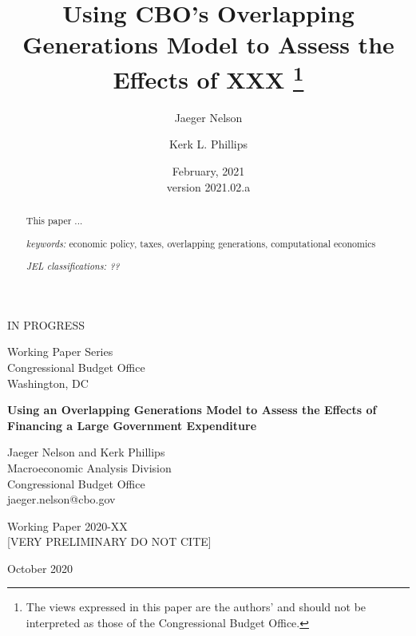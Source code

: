 \documentclass[letterpaper,12pt]{article}
\numberwithin{equation}{section}
\numberwithin{figure}{section}
\numberwithin{table}{section}
\begin{document}
\begin{titlepage}
	\title{Using CBO's Overlapping Generations Model to Assess the Effects of XXX
	\thanks{The views expressed in this paper are the authors' and should not be interpreted as those of the Congressional Budget Office.}}

    \author[1]{Jaeger Nelson}
	\author[1]{Kerk L. Phillips}


	\date{February, 2021\\
	\small{version 2021.02.a}}
	
	\maketitle

	\vspace{-0.3 in}
	\begin{abstract}
	\small{
	This paper ... 

	\vspace{0.1 in}

	\textit{keywords:} economic policy, taxes, overlapping generations, computational economics

	\vspace{0.1 in}

	\textit{JEL classifications: ??} }
	\end{abstract}

	\centering
	IN PROGRESS
	\thispagestyle{empty}
\end{titlepage}


\pagestyle{empty}

\begin{center}
Working Paper Series\\
Congressional Budget Office\\
Washington, DC\vspace{0.75in}

\textbf{\Large Using an Overlapping Generations Model to Assess the Effects of Financing a Large Government Expenditure}

\vspace{5em}

Jaeger Nelson and Kerk Phillips\\
Macroeconomic Analysis Division\\
Congressional Budget Office\\
jaeger.nelson@cbo.gov

\vspace{5em}

Working Paper 2020-XX\\

\vspace{2em}
\Large [VERY PRELIMINARY DO NOT CITE]\\
\vspace{2em}
\normalsize

October 2020\\

\end{center}
\end{document}
